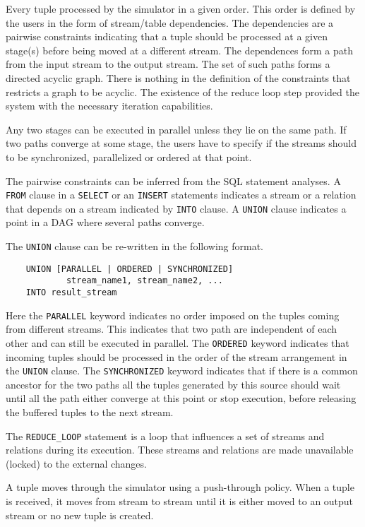 \documentclass{article}
\begin{document}
Every tuple processed by the simulator in a given order. This order is defined by the users in the form of stream/table dependencies. The dependencies are a pairwise constraints indicating that a tuple should be processed at a given stage(s) before being moved at a different stream. The dependences form a path from the input stream to the output stream. The set of such paths forms a directed acyclic graph. There is nothing in the definition of the constraints that restricts a graph to be acyclic. The existence of the reduce loop step provided the system with the necessary iteration capabilities. 

Any two stages can be executed in parallel unless they lie on the same path. If two paths converge at some stage, the users have to specify if the streams should to be synchronized, parallelized or ordered at that point.

The pairwise constraints can be inferred from the SQL statement analyses. A {\tt FROM} clause in a {\tt SELECT} or an {\tt INSERT} statements indicates a stream or a relation that depends on a stream indicated by {\tt INTO} clause. A {\tt UNION} clause indicates a point in a DAG where several paths converge.

The {\tt UNION} clause can be re-written in the following format.

\begin{verbatim}
    UNION [PARALLEL | ORDERED | SYNCHRONIZED]
            stream_name1, stream_name2, ...
    INTO result_stream
\end{verbatim}   

\noindent Here the {\tt PARALLEL} keyword indicates no order imposed on the tuples coming from different streams. This indicates that two path are independent of each other and can still be executed in parallel. The {\tt ORDERED} keyword indicates that incoming tuples should be processed in the order of the stream arrangement in the {\tt UNION} clause. The {\tt SYNCHRONIZED} keyword indicates that if there is a common ancestor for the two paths all the tuples generated by this source should wait until all the path either converge at this point or stop execution, before releasing the buffered tuples to the next stream. 

The {\tt REDUCE\_LOOP} statement is a loop that influences a set of streams and relations during its execution. These streams and relations are made unavailable (locked) to the external changes. 

A tuple moves through the simulator using a push-through policy. When a tuple is received, it moves from stream to stream until it is either moved to an output stream or no new tuple is created.
\end{document}

